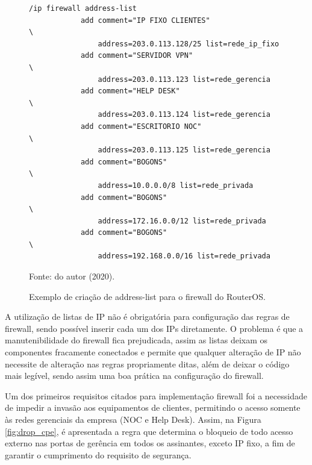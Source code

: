     \begin{figure}[!htb]
        \centering
        \caption{Exemplo de criação de address-list para o firewall do RouterOS.} 
        \label{fig:firewall_addrlist}
        
        \begin{Verbatim}[fontsize=\normalsize]
            /ip firewall address-list
            add comment="IP FIXO CLIENTES"                  \
                address=203.0.113.128/25 list=rede_ip_fixo
            add comment="SERVIDOR VPN"                      \
                address=203.0.113.123 list=rede_gerencia
            add comment="HELP DESK"                         \
                address=203.0.113.124 list=rede_gerencia
            add comment="ESCRITORIO NOC"                    \
                address=203.0.113.125 list=rede_gerencia
            add comment="BOGONS"                            \
                address=10.0.0.0/8 list=rede_privada
            add comment="BOGONS"                            \
                address=172.16.0.0/12 list=rede_privada
            add comment="BOGONS"                            \
                address=192.168.0.0/16 list=rede_privada
        \end{Verbatim} 

        {\small Fonte: do autor (2020).} 
    \end{figure}
    
    A utilização de listas de IP não é obrigatória para configuração das regras de firewall, sendo possível inserir cada um dos IPs diretamente. O problema é que a manutenibilidade do firewall fica prejudicada, assim as listas deixam os componentes fracamente conectados e permite que qualquer alteração de IP não necessite de alteração nas regras propriamente ditas, além de deixar o código mais legível, sendo assim uma boa prática na configuração do firewall.
    
    
    
    Um dos primeiros requisitos citados para implementação firewall foi a necessidade de impedir a invasão aos equipamentos de clientes, permitindo o acesso somente às redes gerenciais da empresa (NOC e Help Desk). Assim, na Figura \ref{fig:drop_cpe},  é apresentada a regra que determina o bloqueio de todo acesso externo nas portas de gerência em todos os assinantes, exceto IP fixo, a fim de garantir o cumprimento do requisito de segurança.
    
